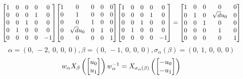 \documentclass[11pt]{article}
\theoremstyle{definition}
\begin{document}
\[
\scaletoalign{\textwidth}{{\left[\begin{matrix}1 & 0 & 0 & 0 & 0\\0 & 0 & 0 & 1 & 0\\0 & 0 & 1 & 0 & 0\\0 & 1 & 0 & 0 & 0\\0 & 0 & 0 & 0 & -1\end{matrix}\right]} {\left[\begin{matrix}1 & 0 & 0 & 0 & 0\\0 & 1 & 0 & 0 & 0\\0 & 0 & 1 & 0 & 0\\0 & \sqrt{d} u_{0} & 0 & 1 & 0\\0 & 0 & 0 & 0 & 1\end{matrix}\right]} {\left[\begin{matrix}1 & 0 & 0 & 0 & 0\\0 & 0 & 0 & 1 & 0\\0 & 0 & 1 & 0 & 0\\0 & 1 & 0 & 0 & 0\\0 & 0 & 0 & 0 & -1\end{matrix}\right]} = {\left[\begin{matrix}1 & 0 & 0 & 0 & 0\\0 & 1 & 0 & \sqrt{d} u_{0} & 0\\0 & 0 & 1 & 0 & 0\\0 & 0 & 0 & 1 & 0\\0 & 0 & 0 & 0 & 1\end{matrix}\right]}}
\]
\[
\alpha = \left( 0, \  -2, \  0, \  0, \  0\right), \beta = \left( 0, \  -1, \  0, \  0, \  0\right), \sigma_{\alpha}(\beta) = \left( 0, \  1, \  0, \  0, \  0\right)
\]
\[
\scaletoalign{\textwidth}{w_{\alpha} X_{\beta}\left(\left[\begin{matrix}u_{0}\\u_{1}\end{matrix}\right]\right) w_{\alpha}^{-1} = X_{\sigma_{\alpha}\left(\beta\right)}\left(\left[\begin{matrix}- u_{0}\\- u_{1}\end{matrix}\right]\right)}
\]
\end{document}
